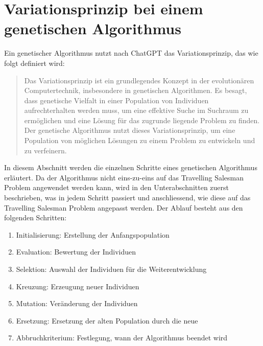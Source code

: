 %
%
%
%
\section{Variationsprinzip bei einem genetischen Algorithmus
\label{buch:paper:varalg:section:genetic_algorithm_process}}
Ein genetischer Algorithmus nutzt nach ChatGPT das Variationsprinzip, 
das wie folgt definiert wird:
\begin{quote}
Das Variationsprinzip ist ein grundlegendes Konzept in der 
evolutionären Computertechnik, insbesondere in genetischen 
Algorithmen. Es besagt, dass genetische Vielfalt in einer 
Population von Individuen aufrechterhalten werden muss, 
um eine effektive Suche im Suchraum zu ermöglichen und eine 
Lösung für das zugrunde liegende Problem zu finden.
\\
Der genetische Algorithmus nutzt dieses Variationsprinzip, um eine 
Population von möglichen Lösungen zu einem Problem zu entwickeln 
und zu verfeinern\cite{chatgpt2024}.
\end{quote}
In diesem Abschnitt werden die einzelnen Schritte eines genetischen Algorithmus 
erläutert. Da der Algorithmus nicht eins-zu-eins auf das Travelling Salesman
Problem angewendet werden kann, wird in den Unterabschnitten zuerst beschrieben,
was in jedem Schritt passiert und anschliessend, wie diese auf das Travelling 
Salesman Problem angepasst werden.
Der Ablauf besteht aus den folgenden Schritten:
\begin{enumerate}
    \item Initialisierung: Erstellung der Anfangspopulation
    \item Evaluation: Bewertung der Individuen
    \item Selektion: Auswahl der Individuen für die Weiterentwicklung
    \item Kreuzung: Erzeugung neuer Individuen
    \item Mutation: Veränderung der Individuen
    \item Ersetzung: Ersetzung der alten Population durch die neue
    \item Abbruchkriterium: Festlegung, wann der Algorithmus beendet wird
\end{enumerate}









